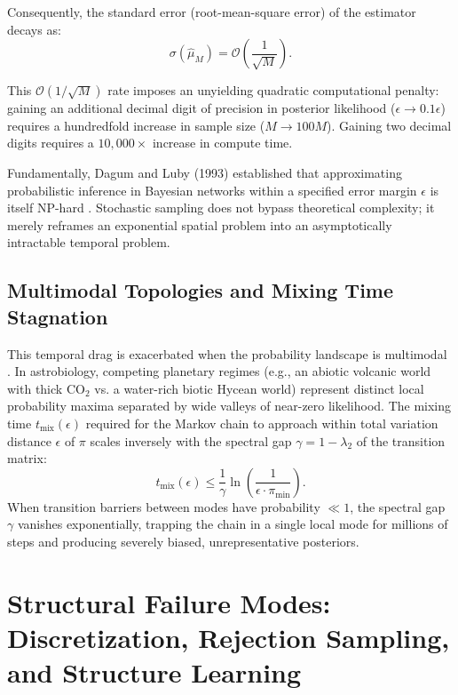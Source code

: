 Consequently, the standard error (root-mean-square error) of the estimator decays as:
\begin{equation}
\sigma(\hat{\mu}_M) = \mathcal{O}\left(\frac{1}{\sqrt{M}}\right).
\label{eq:mcmc_asymptotic_rate}
\end{equation}

This $\mathcal{O}(1/\sqrt{M})$ rate imposes an unyielding quadratic computational penalty: gaining an additional decimal digit of precision in posterior likelihood ($\epsilon \to 0.1\epsilon$) requires a hundredfold increase in sample size ($M \to 100M$). Gaining two decimal digits requires a $10,000\times$ increase in compute time.

Fundamentally, Dagum and Luby (1993) established that approximating probabilistic inference in Bayesian networks within a specified error margin $\epsilon$ is itself NP-hard \cite{dagum1993}. Stochastic sampling does not bypass theoretical complexity; it merely reframes an exponential spatial problem into an asymptotically intractable temporal problem.

\subsection{Multimodal Topologies and Mixing Time Stagnation}
This temporal drag is exacerbated when the probability landscape is multimodal \cite{mackay2003}. In astrobiology, competing planetary regimes (e.g., an abiotic volcanic world with thick $\mathrm{CO}_2$ vs. a water-rich biotic Hycean world) represent distinct local probability maxima separated by wide valleys of near-zero likelihood. The mixing time $t_{\mathrm{mix}}(\epsilon)$ required for the Markov chain to approach within total variation distance $\epsilon$ of $\pi$ scales inversely with the spectral gap $\gamma = 1 - \lambda_2$ of the transition matrix:
\begin{equation}
t_{\mathrm{mix}}(\epsilon) \le \frac{1}{\gamma} \ln\left(\frac{1}{\epsilon \cdot \pi_{\min}}\right).
\label{eq:spectral_gap_mixing_time}
\end{equation}
When transition barriers between modes have probability $\ll 1$, the spectral gap $\gamma$ vanishes exponentially, trapping the chain in a single local mode for millions of steps and producing severely biased, unrepresentative posteriors.

\section{Structural Failure Modes: Discretization, Rejection Sampling, and Structure Learning}\label{sec:structural_failure_modes}

